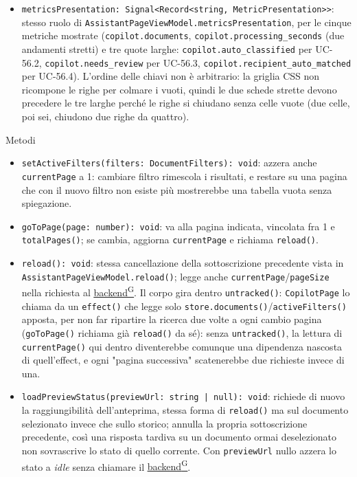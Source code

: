 \documentclass[a4paper,12pt]{article}
\providecommand{\glslink}[2]{\href{https://alittlebyte-19.github.io/Documentazione/glossario.html\#gls-#1}{\underline{#2}\textsuperscript{\scriptsize G}}}
\begin{document}
\begin{sloppypar}
\begin{itemize}
    \item \texttt{metricsPresentation: Signal<Record<string, MetricPresentation>>}: stesso ruolo di \texttt{AssistantPageViewModel.metricsPresentation}, per le cinque metriche mostrate (\texttt{copilot.documents}, \texttt{copilot.processing\_seconds} (due andamenti stretti) e tre quote larghe: \texttt{copilot.auto\_classified} per UC-56.2, \texttt{copilot.needs\_review} per UC-56.3, \texttt{copilot.recipient\_auto\_matched} per UC-56.4). L'ordine delle chiavi non è arbitrario: la griglia CSS non ricompone le righe per colmare i vuoti, quindi le due schede strette devono precedere le tre larghe perché le righe si chiudano senza celle vuote (due celle, poi sei, chiudono due righe da quattro).
\end{itemize}

Metodi
\begin{itemize}\raggedright
    \item \texttt{setActiveFilters(filters: DocumentFilters): void}: azzera anche \texttt{currentPage} a 1: cambiare filtro rimescola i risultati, e restare su una pagina che con il nuovo filtro non esiste più mostrerebbe una tabella vuota senza spiegazione.
    \item \texttt{goToPage(page: number): void}: va alla pagina indicata, vincolata fra 1 e \texttt{totalPages()}; se cambia, aggiorna \texttt{currentPage} e richiama \texttt{reload()}.
    \item \texttt{reload(): void}: stessa cancellazione della sottoscrizione precedente vista in \texttt{AssistantPageViewModel.reload()}; legge anche \texttt{currentPage}/\texttt{pageSize} nella richiesta al \glslink{backend}{backend}. Il corpo gira dentro \texttt{untracked()}: \texttt{CopilotPage} lo chiama da un \texttt{effect()} che legge solo \texttt{store.documents()}/\texttt{activeFilters()} apposta, per non far ripartire la ricerca due volte a ogni cambio pagina (\texttt{goToPage()} richiama già \texttt{reload()} da sé): senza \texttt{untracked()}, la lettura di \texttt{currentPage()} qui dentro diventerebbe comunque una dipendenza nascosta di quell'effect, e ogni "pagina successiva" scatenerebbe due richieste invece di una.
    \item \texttt{loadPreviewStatus(previewUrl: string | null): void}: richiede di nuovo la raggiungibilità dell'anteprima, stessa forma di \texttt{reload()} ma sul documento selezionato invece che sullo storico; annulla la propria sottoscrizione precedente, così una risposta tardiva su un documento ormai deselezionato non sovrascrive lo stato di quello corrente. Con \texttt{previewUrl} nullo azzera lo stato a \textit{idle} senza chiamare il \glslink{backend}{backend}.

\end{itemize}
\end{sloppypar}
\end{document}
